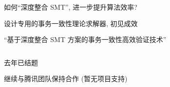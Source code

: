 \begin{frame}{}
	\begin{center}
		 如何``深度整合 SMT'', 进一步提升算法效率?

		\vspace{0.50cm}
	\end{center}
\end{frame}

\begin{frame}{}
  \begin{center}
		 设计专用的事务一致性理论求解器, 初见成效

  \end{center}
\end{frame}

\begin{frame}{}
	\begin{center}
		``基于深度整合 SMT 方案的事务一致性高效验证技术''
	\end{center}
\end{frame}

\begin{frame}{}
	\begin{columns}
		  \begin{center}
				去年已结题


				\vspace{0.30cm}
				继续与腾讯团队保持合作 (暂无项目支持)
			\end{center}
	\end{columns}

	\vspace{0.30cm}
	\begin{center}
	\end{center}
\end{frame}
